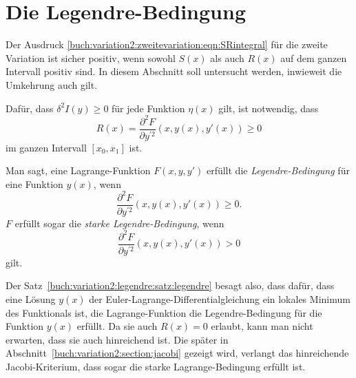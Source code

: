 %
%
%
\section{Die Legendre-Bedingung
\label{buch:variation2:section:legendre}}
Der Ausdruck \eqref{buch:variation2:zweitevariation:eqn:SRintegral}
für die zweite Variation ist sicher positiv, wenn sowohl $S(x)$
als auch $R(x)$ auf dem ganzen Intervall positiv sind.
In diesem Abschnitt soll untersucht werden, inwieweit die
Umkehrung auch gilt.

\begin{satz}[Legendre]
\label{buch:variation2:legendre:satz:legendre}
Dafür, dass $\delta^2I(y)\ge 0$ für jede Funktion $\eta(x)$ gilt, ist
notwendig, dass
\[
R(x)
=
\frac{\partial^2F}{\partial y^{\prime 2}}(x,y(x),y'(x))
\ge
0
\]
im ganzen Intervall $[x_0,x_1]$ ist.
\end{satz}

\begin{definition}
Man sagt, eine Lagrange-Funktion $F(x,y,y')$ erfüllt die
{\em Legendre-Bedingung}
%
für eine Funktion $y(x)$, wenn 
\[
\frac{\partial^2 F}{\partial y^{\prime 2}}(x,y(x),y'(x)) \ge 0.
\]
$F$ erfüllt sogar die {\em starke Legendre-Bedingung}, wenn
\[
\frac{\partial^2 F}{\partial y^{\prime 2}}(x,y(x),y'(x)) > 0
\]
gilt.
\end{definition}

Der Satz~\ref{buch:variation2:legendre:satz:legendre} besagt also,
dass dafür, dass eine Lösung $y(x)$ der
Euler-Lagrange-Diffe\-ren\-tial\-gleichung
ein lokales Minimum des Funktionals ist, die Lagrange-Funktion
die Legendre-Bedingung für die Funktion $y(x)$ erfüllt.
Da sie auch $R(x)=0$ erlaubt, kann man nicht erwarten, dass sie auch
hinreichend ist.
Die später in Abschnitt~\ref{buch:variation2:section:jacobi} gezeigt wird,
verlangt das hinreichende Jacobi-Kriterium, dass sogar die starke
Lagrange-Bedingung erfüllt ist.

